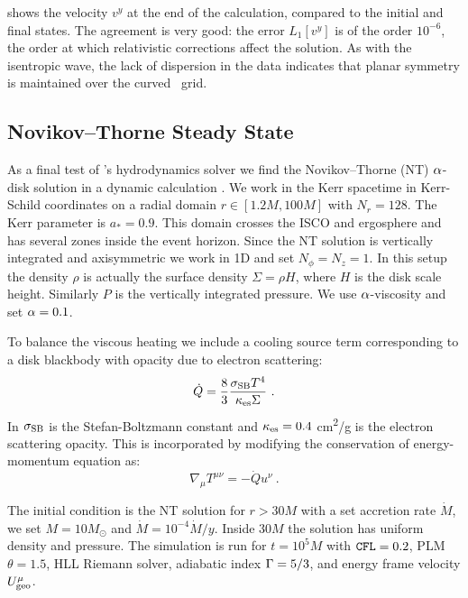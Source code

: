  shows the velocity $v^y$ at the end of the calculation, compared to the initial and final states.  The agreement is very good: the error $L_1[v^y]$ is of the order $10^{-6}$, the order at which relativistic corrections affect the solution.  As with the isentropic wave, the lack of dispersion in the data indicates that planar symmetry is maintained over the curved \disco\ grid.

\subsection{Novikov--Thorne Steady State}

As a final test of \grdisco's hydrodynamics solver we find the Novikov--Thorne (NT) $\alpha$-disk solution in a dynamic calculation \citep{Novikov73}.  We work in the Kerr spacetime in Kerr-Schild coordinates on a radial domain $r \in [1.2M, 100M]$ with $N_r = 128$.  The Kerr parameter is $a_* =0.9$.   This domain crosses the ISCO and ergosphere and has several zones inside the event horizon.  Since the NT solution is vertically integrated and axisymmetric we work in 1D and set $N_\phi = N_z = 1$.  In this setup the density $\rho$ is actually the surface density $\Sigma = \rho H$, where $H$ is the disk scale height.  Similarly $P$ is the vertically integrated pressure.  We use $\alpha$-viscosity and set $\alpha = 0.1$.  

To balance the viscous heating we include a cooling source term corresponding to a disk blackbody with opacity due to electron scattering:
\begin{equation}
	\dot{Q} = \frac{8}{3}\frac{ \sig_{\rm SB}T^4}{\ka_{\rm es} \Sig}\ . \eqlabel{BBcooling}
\end{equation}
In  $\sigma_{\rm SB}$ is the Stefan-Boltzmann constant and $\kappa_{\rm es} = 0.4$ cm\textsuperscript{2}/g is the electron scattering opacity.  This is incorporated by modifying the conservation of energy-momentum equation as:
\begin{equation}
	\nabla_\mu T^{\mu\nu} = - \dot{Q} u^\nu\ .
\end{equation}

The initial condition is the NT solution for $r>30M$ with a set accretion rate $\dot{M}$, we set $M = 10 M_\odot$ and $\dot{M} = 10^{-4} \dot{M}/y$.  Inside $30M$ the solution has uniform density and pressure.  The simulation is run for $t = 10^5 M$ with ${\tt CFL}=0.2$, PLM $\theta=1.5$, HLL Riemann solver, adiabatic index $\Gamma = 5/3$, and energy frame velocity $U^\mu_{\rm geo}$. 

